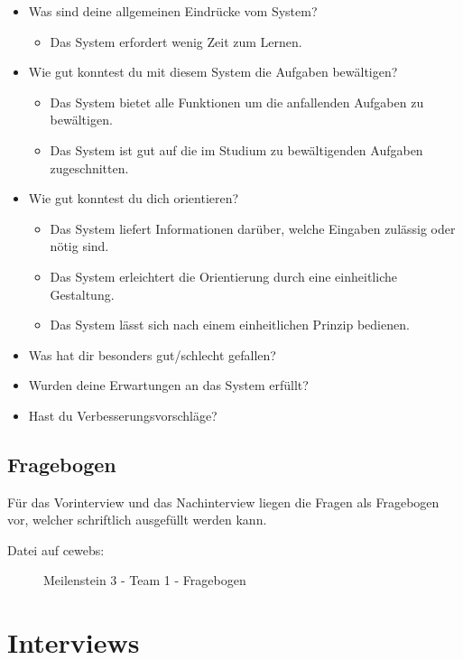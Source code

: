 \documentclass[a4paper,10pt]{scrartcl}
\begin{document}
\begin{itemize}

 \item Was sind deine allgemeinen Eindrücke vom System?
 \begin{itemize}
    \item Das System erfordert wenig Zeit zum Lernen.
 \end{itemize}
 \item Wie gut konntest du mit diesem System die Aufgaben bewältigen?
 \begin{itemize}
    \item Das System bietet alle Funktionen um die anfallenden Aufgaben zu bewältigen.
    \item Das System ist gut auf die im Studium zu bewältigenden Aufgaben zugeschnitten.
 \end{itemize}
 \item Wie gut konntest du dich orientieren?
 \begin{itemize}
    \item Das System liefert Informationen darüber, welche Eingaben zulässig oder nötig sind.
    \item Das System erleichtert die Orientierung durch eine einheitliche Gestaltung.
    \item Das System lässt sich nach einem einheitlichen Prinzip bedienen.
 \end{itemize}
 \item Was hat dir besonders gut/schlecht gefallen?
 \item Wurden deine Erwartungen an das System erfüllt?
 \item Hast du Verbesserungsvorschläge?
\end{itemize}

\subsection{Fragebogen}

Für das Vorinterview und das Nachinterview liegen die Fragen als Fragebogen vor, welcher schriftlich ausgefüllt werden kann.

\begin{description}
 \item[Datei auf cewebs:]Meilenstein 3 - Team 1 - Fragebogen
\end{description}

\section{Interviews}
\end{document}
